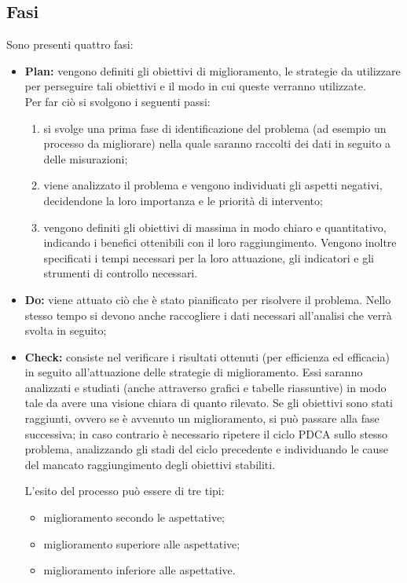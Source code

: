 \subsection{Fasi}
Sono presenti quattro fasi:
\begin{itemize}
	\item  \textbf{Plan:} vengono definiti gli obiettivi di miglioramento, le strategie da utilizzare per perseguire tali obiettivi e il modo in cui queste verranno utilizzate. \\
	Per far ciò si svolgono i seguenti passi:
	\begin{enumerate}
		\item si svolge una prima fase di identificazione del problema (ad esempio un processo da migliorare) nella quale saranno raccolti dei dati in seguito a delle misurazioni; 
		\item viene analizzato il problema e vengono individuati gli aspetti negativi, decidendone la loro importanza e le priorità di intervento;
		\item vengono definiti gli obiettivi di massima in modo chiaro e quantitativo, indicando i benefici ottenibili con il loro raggiungimento. Vengono inoltre specificati i tempi necessari per la loro attuazione, gli indicatori e gli strumenti di controllo necessari.
	\end{enumerate}
		
	
	\item  \textbf{Do:} viene attuato ciò che è stato pianificato per risolvere il problema. Nello stesso tempo si devono anche raccogliere i dati necessari all'analisi che verrà svolta in seguito;
	
	\item  \textbf{Check:} consiste nel verificare i risultati ottenuti (per efficienza ed efficacia) in seguito all'attuazione delle strategie di miglioramento. Essi saranno analizzati e studiati (anche attraverso grafici e tabelle riassuntive) in modo tale da avere una visione chiara di quanto rilevato. Se gli obiettivi sono stati raggiunti, ovvero se è avvenuto un miglioramento, si può passare alla fase successiva; in caso contrario è necessario ripetere il ciclo PDCA sullo stesso problema, analizzando gli stadi del ciclo precedente e individuando le cause del mancato raggiungimento degli obiettivi stabiliti.
	
	L'esito del processo può essere di tre tipi:
	\begin{itemize}
		\item miglioramento secondo le aspettative;
		\item miglioramento superiore alle aspettative;
		\item miglioramento inferiore alle aspettative.
	\end{itemize}



\end{itemize}
